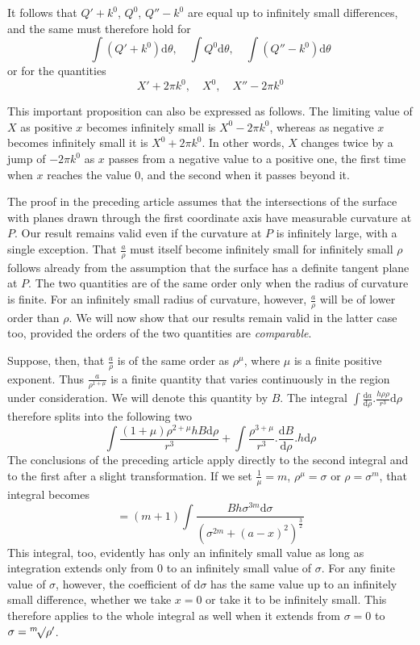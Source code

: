 It follows that $Q'+k^0$, $Q^0$, $Q''-k^0$ are equal up to infinitely small differences, and the same must therefore hold for
\[
\int(Q'+k^0)\mathrm d\theta,\quad\int Q^0\mathrm d\theta,\quad\int(Q''-k^0)\mathrm d\theta
\]
or for the quantities
\[
X'+2\pi k^0,\quad X^0,\quad X''-2\pi k^0
\]

%
This important proposition can also be expressed as follows. The limiting value of $X$ as positive $x$ becomes infinitely small is $X^0-2\pi k^0$, whereas as negative $x$ becomes infinitely small it is $X^0+2\pi k^0$. In other words, $X$ changes twice by a jump of $-2\pi k^0$ as $x$ passes from a negative value to a positive one, the first time when $x$ reaches the value $0$, and the second when it passes beyond it.

The proof in the preceding article assumes that the intersections of the surface with planes drawn through the first coordinate axis have measurable curvature at $P$. Our result remains valid even if the curvature at $P$ is infinitely large, with a single exception. That $\frac a\rho$ must itself become infinitely small for infinitely small $\rho$ follows already from the assumption that the surface has a definite tangent plane at $P$. The two quantities are of the same order only when the radius of curvature is finite. For an infinitely small radius of curvature, however, $\frac a\rho$ will be of lower order than $\rho$. We will now show that our results remain valid in the latter case too, provided the orders of the two quantities are \textit{comparable}.

Suppose, then, that $\frac a\rho$ is of the same order as $\rho^\mu$, where $\mu$ is a finite positive exponent. Thus $\frac{a}{\rho^{1+\mu}}$ is a finite quantity that varies continuously in the region under consideration. We will denote this quantity by $B$. The integral $\int\frac{\mathrm da}{\mathrm d\rho}.\frac{h\rho\rho}{r^3}\mathrm d\rho$ therefore splits into the following two
\[
\int\frac{(1+\mu)\rho^{2+\mu}hB\mathrm d\rho}{r^3}+\int\frac{\rho^{3+\mu}}{r^3}.\frac{\mathrm dB}{\mathrm d\rho}.h\mathrm d\rho
\]
The conclusions of the preceding article apply directly to the second integral and to the first after a slight transformation. If we set $\frac1\mu=m$, $\rho^\mu=\sigma$ or $\rho=\sigma^m$, that integral becomes
\[
=(m+1)\int\frac{Bh\sigma^{3m}\mathrm d\sigma}{(\sigma^{2m}+(a-x)^2)^{\frac32}}
\]
This integral, too, evidently has only an infinitely small value as long as integration extends only from $0$ to an infinitely small value of $\sigma$. For any finite value of $\sigma$, however, the coefficient
%
of $\mathrm d\sigma$ has the same value up to an infinitely small difference, whether we take $x=0$ or take it to be infinitely small. This therefore applies to the whole integral as well when it extends from $\sigma=0$ to $\sigma=\BareRoot[m]{\rho'}$.

